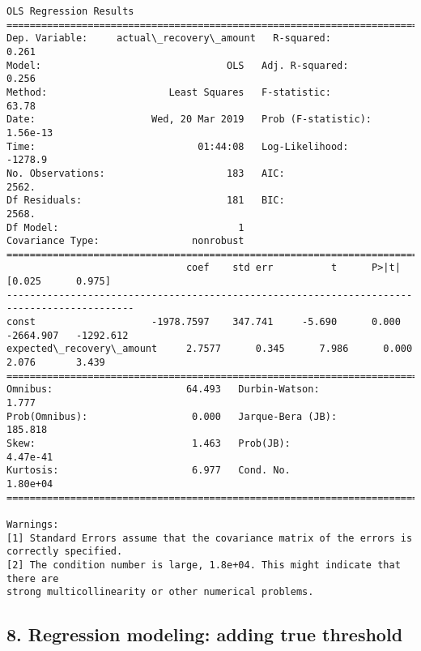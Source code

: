 \documentclass[11pt]{article}
\begin{document}
    \begin{Verbatim}[commandchars=\\\{\}]
                              OLS Regression Results                              
==================================================================================
Dep. Variable:     actual\_recovery\_amount   R-squared:                       0.261
Model:                                OLS   Adj. R-squared:                  0.256
Method:                     Least Squares   F-statistic:                     63.78
Date:                    Wed, 20 Mar 2019   Prob (F-statistic):           1.56e-13
Time:                            01:44:08   Log-Likelihood:                -1278.9
No. Observations:                     183   AIC:                             2562.
Df Residuals:                         181   BIC:                             2568.
Df Model:                               1                                         
Covariance Type:                nonrobust                                         
============================================================================================
                               coef    std err          t      P>|t|      [0.025      0.975]
--------------------------------------------------------------------------------------------
const                    -1978.7597    347.741     -5.690      0.000   -2664.907   -1292.612
expected\_recovery\_amount     2.7577      0.345      7.986      0.000       2.076       3.439
==============================================================================
Omnibus:                       64.493   Durbin-Watson:                   1.777
Prob(Omnibus):                  0.000   Jarque-Bera (JB):              185.818
Skew:                           1.463   Prob(JB):                     4.47e-41
Kurtosis:                       6.977   Cond. No.                     1.80e+04
==============================================================================

Warnings:
[1] Standard Errors assume that the covariance matrix of the errors is correctly specified.
[2] The condition number is large, 1.8e+04. This might indicate that there are
strong multicollinearity or other numerical problems.

    \end{Verbatim}

    \subsection{8. Regression modeling: adding true
threshold}\label{regression-modeling-adding-true-threshold}
\end{document}

